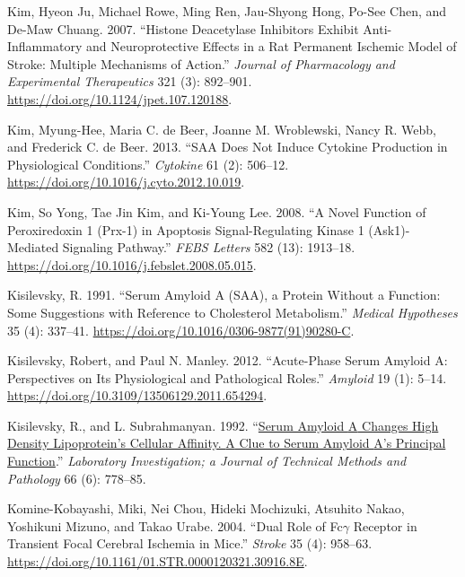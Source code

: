 \documentclass[9pt,lineno]{elife}
\newlength{\cslhangindent}
\newlength{\cslentryspacingunit} %
\newenvironment{CSLReferences}[2] %
 {%
  \setlength{\parindent}{0pt}
  \ifodd #1
  \let\oldpar\par
  \def\par{\hangindent=\cslhangindent\oldpar}
  \fi
  \setlength{\parskip}{#2\cslentryspacingunit}
 }%
 {}
\begin{document}
\begin{CSLReferences}{1}{0}
\leavevmode{}%
Kim, Hyeon Ju, Michael Rowe, Ming Ren, Jau-Shyong Hong, Po-See Chen, and De-Maw Chuang. 2007. {``Histone {Deacetylase Inhibitors Exhibit Anti-Inflammatory} and {Neuroprotective Effects} in a {Rat Permanent Ischemic Model} of {Stroke}: {Multiple Mechanisms} of {Action}.''} \emph{Journal of Pharmacology and Experimental Therapeutics} 321 (3): 892--901. \url{https://doi.org/10.1124/jpet.107.120188}.

\leavevmode{}%
Kim, Myung-Hee, Maria C. de Beer, Joanne M. Wroblewski, Nancy R. Webb, and Frederick C. de Beer. 2013. {``{SAA} Does Not Induce Cytokine Production in Physiological Conditions.''} \emph{Cytokine} 61 (2): 506--12. \url{https://doi.org/10.1016/j.cyto.2012.10.019}.

\leavevmode{}%
Kim, So Yong, Tae Jin Kim, and Ki-Young Lee. 2008. {``A Novel Function of Peroxiredoxin 1 ({Prx-1}) in Apoptosis Signal-Regulating Kinase 1 ({Ask1})-Mediated Signaling Pathway.''} \emph{FEBS Letters} 582 (13): 1913--18. \url{https://doi.org/10.1016/j.febslet.2008.05.015}.

\leavevmode{}%
Kisilevsky, R. 1991. {``Serum Amyloid {A} ({SAA}), a Protein Without a Function: {Some} Suggestions with Reference to Cholesterol Metabolism.''} \emph{Medical Hypotheses} 35 (4): 337--41. \url{https://doi.org/10.1016/0306-9877(91)90280-C}.

\leavevmode{}%
Kisilevsky, Robert, and Paul N. Manley. 2012. {``Acute-Phase Serum Amyloid {A}: {Perspectives} on Its Physiological and Pathological Roles.''} \emph{Amyloid} 19 (1): 5--14. \url{https://doi.org/10.3109/13506129.2011.654294}.

\leavevmode{}%
Kisilevsky, R., and L. Subrahmanyan. 1992. {``\href{https://www.ncbi.nlm.nih.gov/pubmed/1602745}{Serum Amyloid {A} Changes High Density Lipoprotein's Cellular Affinity. {A} Clue to Serum Amyloid {A}'s Principal Function}.''} \emph{Laboratory Investigation; a Journal of Technical Methods and Pathology} 66 (6): 778--85.

\leavevmode{}%
Komine-Kobayashi, Miki, Nei Chou, Hideki Mochizuki, Atsuhito Nakao, Yoshikuni Mizuno, and Takao Urabe. 2004. {``Dual {Role} of {Fc\(\gamma\) Receptor} in {Transient Focal Cerebral Ischemia} in {Mice}.''} \emph{Stroke} 35 (4): 958--63. \url{https://doi.org/10.1161/01.STR.0000120321.30916.8E}.


\end{CSLReferences}
\end{document}
